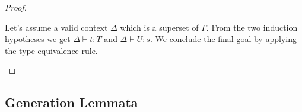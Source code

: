 \begin{theorem}
\begin{proof}
\begin{enumerate}
            Let's assume a valid context $\Delta$ which is a superset of
            $\Gamma$. From the two induction hypotheses we get $\Delta \vdash t
            : T$ and $\Delta \vdash U : s$. We conclude the final goal by
            applying the type equivalence rule.
        \end{enumerate}
    \end{proof}
\end{theorem}






\subsection{Generation Lemmata}

